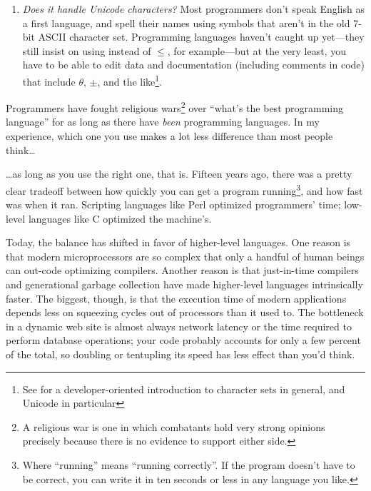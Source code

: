 \documentclass{report}
\begin{document}
\begin{enumerate}
  \item \emph{Does it handle Unicode characters?} Most programmers
  don't speak English as a first language, and spell their names using
  symbols that aren't in the old 7-bit ASCII character set.
  Programming languages haven't caught up yet---they still insist on
  using \code{<=} instead of $\leq$, for example---but at the very
  least, you have to be able to edit data and documentation (including
  comments in code) that include $\theta$, $\pm$, and the
  like\footnote{See \cite{b:spolsky-unicode} for a developer-oriented
  introduction to character sets in general, and Unicode in
  particular}.

\end{enumerate}


Programmers have fought religious wars\footnote{A religious war is one
in which combatants hold very strong opinions precisely because there
is no evidence to support either side.} over ``what's the best
programming language'' for as long as there have \emph{been}
programming languages.  In my experience, which one you use makes a
lot less difference than most people think{\ldots}

{\ldots}as long as you use the right one, that is.  Fifteen years ago,
there was a pretty clear tradeoff between how quickly you can get a
program running\footnote{Where ``running'' means ``running
correctly''.  If the program doesn't have to be correct, you can write
it in ten seconds or less in any language you like.}, and how fast was
when it ran.  Scripting languages like Perl optimized programmers'
time; low-level languages like C optimized the machine's.

Today, the balance has shifted in favor of higher-level languages.
One reason is that modern microprocessors are so complex that only a
handful of human beings can out-code optimizing compilers.  Another
reason is that just-in-time compilers and generational garbage
collection have made higher-level languages intrinsically faster.  The
biggest, though, is that the execution time of modern applications
depends less on squeezing cycles out of processors than it used to.
The bottleneck in a dynamic web site is almost always network latency
or the time required to perform database operations; your code
probably accounts for only a few percent of the total, so doubling or
tentupling its speed has less effect than you'd think.
\end{document}
